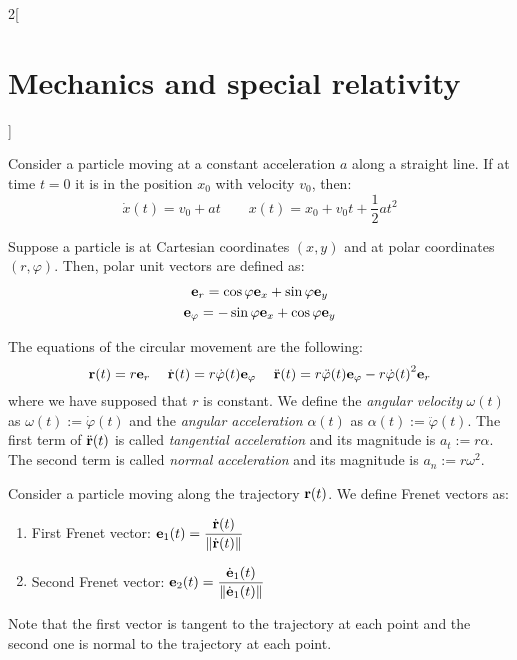 \documentclass[../../../main_physics.tex]{subfiles}
\begin{document}
\begin{multicols}{2}[\section{Mechanics and special relativity}]
\begin{proposition}
  \end{proposition}
  \begin{proposition}
    Consider a particle moving at a constant acceleration $a$ along a straight line. If at time $t=0$ it is in the position $x_0$ with velocity $v_0$, then:
    $$\dot{x}(t)=v_0+at\qquad x(t)=x_0+v_0t+\frac{1}{2}at^2$$
  \end{proposition}
  \begin{definition}
    Suppose a particle is at Cartesian coordinates $(x,y)$ and at polar coordinates $(r,\varphi)$. Then, polar unit vectors are defined as:
    \begin{gather*}
      \boldsymbol{\mathrm{e}}_r=\cos\varphi\boldsymbol{\mathrm{e}}_x+\sin\varphi\boldsymbol{\mathrm{e}}_y\\
      \boldsymbol{\mathrm{e}}_\varphi=-\sin\varphi\boldsymbol{\mathrm{e}}_x+\cos\varphi\boldsymbol{\mathrm{e}}_y
    \end{gather*}
  \end{definition}
  \begin{definition}
    The equations of the circular movement are the following: $$\boldsymbol{\mathrm{r}}(t)=r\boldsymbol{\mathrm{e}}_r\quad\;\dot{\boldsymbol{\mathrm{r}}}(t)=r\dot{\varphi}(t)\boldsymbol{\mathrm{e}}_\varphi\quad\;\ddot{\boldsymbol{\mathrm{r}}}(t)=r\ddot{\varphi}(t)\boldsymbol{\mathrm{e}}_\varphi-r{\dot{\varphi}(t)}^2\boldsymbol{\mathrm{e}}_r$$ where we have supposed that $r$ is constant. We define the \emph{angular velocity} $\omega(t)$ as $\omega(t):=\dot{\varphi}(t)$ and the \emph{angular acceleration} $\alpha(t)$ as $\alpha(t):=\ddot{\varphi}(t)$. The first term of $\ddot{\boldsymbol{\mathrm{r}}}(t)$ is called \emph{tangential acceleration} and its magnitude is $a_t:=r\alpha$. The second term is called \emph{normal acceleration} and its magnitude is $a_n:=r\omega^2$.
  \end{definition}
  \begin{definition}
    Consider a particle moving along the trajectory $\boldsymbol{\mathrm{r}}(t)$. We define Frenet vectors as:
    \begin{enumerate}
      \item First Frenet vector: $\displaystyle\boldsymbol{\mathrm{e}}_1(t)=\frac{\dot{\boldsymbol{\mathrm{r}}}(t)}{\|\dot{\boldsymbol{\mathrm{r}}}(t)\|}$
      \item Second Frenet vector: $\displaystyle\boldsymbol{\mathrm{e}}_2(t)=\frac{\dot{\boldsymbol{\mathrm{e}}}_1(t)}{\|\dot{\boldsymbol{\mathrm{e}}}_1(t)\|}$
    \end{enumerate}
    Note that the first vector is tangent to the trajectory at each point and the second one is normal to the trajectory at each point.


\end{definition}
\end{multicols}
\end{document}
